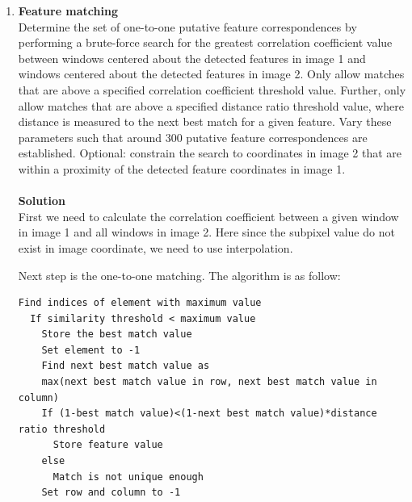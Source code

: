 \documentclass{../../assignment}
\begin{document}
\begin{problemlist}
\begin{enumerate}
\item \textbf{Feature matching}\\
Determine the set of one-to-one putative feature correspondences by performing a brute-force search for the greatest correlation coefficient value between windows centered about the detected features in image 1 and windows centered about the detected features in image 2. Only allow matches that are above a specified correlation coefficient threshold value. Further, only allow matches that are above a specified distance ratio threshold value, where distance is measured to the next best match for a given feature. Vary these parameters such that around 300 putative feature correspondences are established. Optional: constrain the search to coordinates in image 2 that are within a proximity of the detected feature coordinates in image 1.
\\\\
\textbf{Solution}\\
First we need to calculate the correlation coefficient between a given window in image 1 and all windows in image 2. Here since the subpixel value do not exist in image coordinate, we need to use interpolation.

Next step is the one-to-one matching. The algorithm is as follow:
\begin{lstlisting}
Find indices of element with maximum value
  If similarity threshold < maximum value
    Store the best match value
    Set element to -1
    Find next best match value as
    max(next best match value in row, next best match value in column)    
    If (1-best match value)<(1-next best match value)*distance ratio threshold
      Store feature value
    else
      Match is not unique enough    
    Set row and column to -1
\end{lstlisting}



\end{enumerate}
\end{problemlist}
\end{document}
